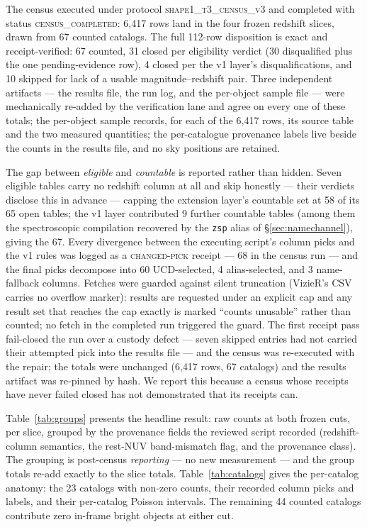 \documentclass[twocolumn]{aastex702}
\begin{document}
The census executed under protocol \textsc{shape1\_t3\_census\_v3} and completed with
status \textsc{census\_completed}: 6{,}417 rows land in the four frozen redshift slices,
drawn from 67 counted catalogs. The full 112-row disposition is exact and
receipt-verified: 67 counted, 31 closed per eligibility verdict (30 disqualified plus
the one pending-evidence row), 4 closed per the v1 layer's disqualifications, and 10
skipped for lack of a usable magnitude--redshift pair. Three independent artifacts ---
the results file, the run log, and the per-object sample file --- were mechanically
re-added by the verification lane and agree on every one of these totals; the per-object sample records, for each of the 6{,}417 rows, its source table and the two
measured quantities; the per-catalogue provenance labels live beside the counts in the
results file, and no sky positions are retained.

The gap between \emph{eligible} and \emph{countable} is reported rather than hidden.
Seven eligible tables carry no redshift column at all and skip honestly --- their
verdicts disclose this in advance --- capping the extension layer's countable set at 58
of its 65 open tables; the v1 layer contributed 9 further countable tables (among them
the spectroscopic compilation recovered by the \texttt{zsp} alias of
\S\ref{sec:namechannel}), giving the 67. Every divergence between the executing script's
column picks and the v1 rules was logged as a \textsc{changed-pick} receipt --- 68 in
the census run --- and the final picks decompose into 60 UCD-selected, 4
alias-selected, and 3 name-fallback columns. Fetches were guarded against silent
truncation (VizieR's CSV carries no overflow marker): results are requested under an
explicit cap and any result set that reaches the cap exactly is marked ``counts
unusable'' rather than counted; no fetch in the completed run triggered the guard. The
first receipt pass fail-closed the run over a custody defect --- seven skipped entries
had not carried their attempted pick into the results file --- and the census was
re-executed with the repair; the totals were unchanged (6{,}417 rows, 67 catalogs) and
the results artifact was re-pinned by hash. We report this because a census whose
receipts have never failed closed has not demonstrated that its receipts can.

Table~\ref{tab:groups} presents the headline result: raw counts at both frozen cuts,
per slice, grouped by the provenance fields the reviewed script recorded (redshift-column
semantics, the rest-NUV band-mismatch flag, and the provenance class). The grouping is
post-census \emph{reporting} --- no new measurement --- and the group totals re-add
exactly to the slice totals. Table~\ref{tab:catalogs} gives the per-catalog anatomy: the
23 catalogs with non-zero counts, their recorded column picks and labels, and their
per-catalog Poisson intervals. The remaining 44 counted catalogs contribute zero
in-frame bright objects at either cut.
\end{document}
